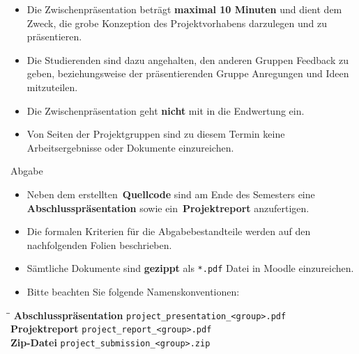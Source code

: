 \begin{frame}
	\begin{itemize}
		\item Die Zwischenpräsentation beträgt \textbf{maximal 10 Minuten} und dient dem Zweck, die grobe Konzeption des Projektvorhabens darzulegen
			und zu präsentieren.
		\item Die Studierenden sind dazu angehalten, den anderen Gruppen Feedback zu geben, beziehungsweise der präsentierenden Gruppe Anregungen
			und Ideen mitzuteilen. 
		\item Die Zwischenpräsentation geht \textbf{nicht} mit in die Endwertung ein.
		\item Von Seiten der Projektgruppen sind zu diesem Termin keine Arbeitsergebnisse oder Dokumente einzureichen.
	\end{itemize}
\end{frame}


\begin{dwHeaderFrame}{Abgabe}
	\begin{itemize}
		\item Neben dem erstellten \,\textbf{Quellcode} sind am Ende des Semesters eine \,\textbf{Abschlusspräsentation} sowie ein
			\,\textbf{Projektreport} anzufertigen.
		\item Die formalen Kriterien für die Abgabebestandteile werden auf den nachfolgenden Folien beschrieben.
		\item Sämtliche Dokumente sind \textbf{gezippt} als \texttt{*.pdf} Datei in Moodle einzureichen.
		\item Bitte beachten Sie folgende Namenskonventionen:
	\end{itemize}
	
	\vspace*{1mm}
	{
	\begin{tabbing}
		\hspace*{4mm}\=\hspace*{4cm}\=\kill
		\> \textbf{Abschlusspräsentation} 	\> \texttt{project\_presentation\_<group>.pdf} 	\\[1mm]
		\> \textbf{Projektreport} 			\> \texttt{project\_report\_<group>.pdf} 		\\[1mm]
		\> \textbf{Zip-Datei}				\> \texttt{project\_submission\_<group>.zip}
	\end{tabbing}}
	
	\vspace*{1mm}
\end{dwHeaderFrame}


